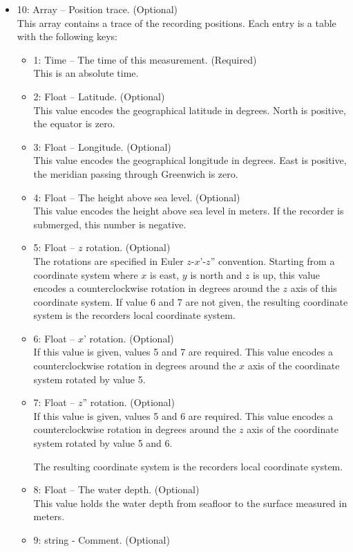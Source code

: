 \documentclass[DIV=10]{scrartcl}
\begin{document}
\begin{itemize}
  \item 10: Array – Position trace. (Optional)\\
  This array contains a trace of the recording positions.
  Each entry is a table with the following keys:
  \begin{itemize}
    \item 1: Time – The time of this measurement. (Required)\\
    This is an absolute time.
    \item 2: Float – Latitude. (Optional)\\
    This value encodes the geographical latitude in degrees.
    North is positive, the equator is zero.
    \item 3: Float – Longitude. (Optional)\\
    This value encodes the geographical longitude in degrees.
    East is positive, the meridian passing through Greenwich is zero.
    \item 4: Float – The height above sea level. (Optional)\\
    This value encodes the height above sea level in meters.
    If the recorder is submerged, this number is negative.
    \item 5: Float – \(z\) rotation. (Optional)\\
    The rotations are specified in Euler \(z\)-\(x\)’-\(z\)” convention.
    Starting from a coordinate system where \(x\) is east, \(y\) is north and \(z\) is up, this value encodes a counterclockwise rotation in degrees around the \(z\) axis of this coordinate system.
    If value 6 and 7 are not given, the resulting coordinate system is the recorders local coordinate system.
    \item 6: Float – \(x\)’ rotation. (Optional)\\
    If this value is given, values 5 and 7 are required.
    This value encodes a counterclockwise rotation in degrees around the \(x\) axis of the coordinate system rotated by value 5.
    \item 7: Float – \(z\)” rotation. (Optional)\\
    If this value is given, values 5 and 6 are required.
    This value encodes a counterclockwise rotation in degrees around the \(z\) axis of the coordinate system rotated by value 5 and 6.

    The resulting coordinate system is the recorders local coordinate system.
    \item 8: Float – The water depth. (Optional)\\
    This value holds the water depth from seafloor to the surface measured in meters.
    \item 9: string - Comment. (Optional)
  \end{itemize}


\end{itemize}
\end{document}
